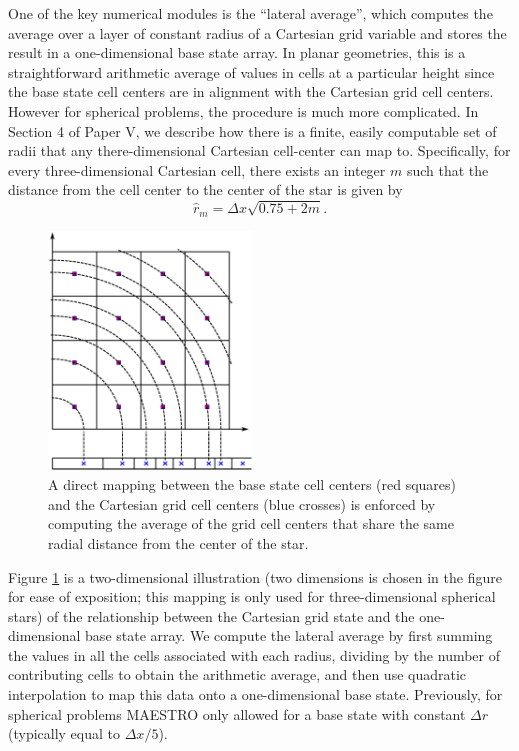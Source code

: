 One of the key numerical modules is the ``lateral average'', which computes the average over a 
layer of constant radius of a Cartesian grid variable and stores the result in a one-dimensional base state array.
In planar geometries, this is a straightforward arithmetic average of values in cells at
a particular height since the base state cell centers are in alignment
with the Cartesian grid cell centers.
However for spherical problems, the procedure is much more complicated.
In Section 4 of Paper V, we describe how there is a finite, easily computable set of radii that any 
there-dimensional Cartesian cell-center can map to.  
Specifically, for every three-dimensional Cartesian cell, there exists an integer $m$ such that the distance
from the cell center to the center of the star is given by 
\begin{equation}
\hat{r}_m=\Delta x\sqrt{0.75+2m}.\label{eqn:radii}
\end{equation}
\begin{figure}[tb]
\centering
\includegraphics[height=2.5in]{./figs/base_spherical_new}
\caption{\label{Fig:NewBaseGrid}  
A direct mapping between the base state cell centers (red squares) and the Cartesian grid cell centers (blue crosses) 
is enforced by computing the average of the grid cell centers that share the same radial distance from 
the center of the star.}
\end{figure}
Figure \ref{Fig:NewBaseGrid} is a two-dimensional illustration 
(two dimensions is chosen in the figure for ease of exposition; this mapping is only used for three-dimensional spherical stars) 
of the relationship between the Cartesian grid state and the one-dimensional base state array.
We compute the lateral average by first summing the values in all the cells associated with each radius,
dividing by the number of contributing cells to obtain the arithmetic average, and then use quadratic interpolation to map this data onto a one-dimensional base state.
Previously, for spherical problems MAESTRO only allowed for a base state with constant $\Delta r$ (typically equal to $\Delta x/5$).

